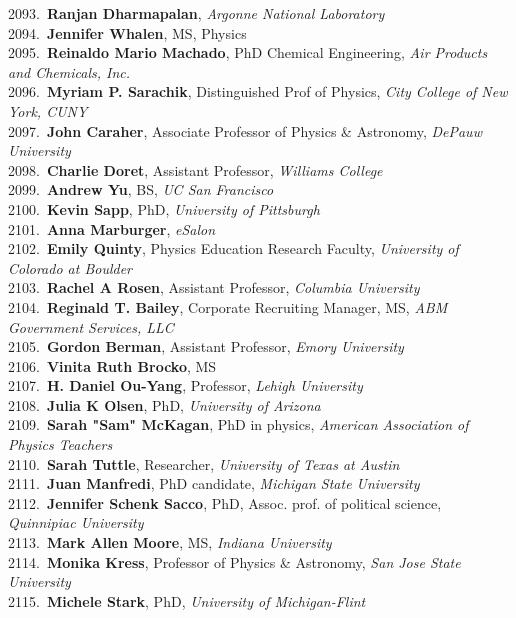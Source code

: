 2093.~{\bf Ranjan Dharmapalan}, {\sl Argonne National Laboratory} \\
2094.~{\bf Jennifer Whalen}, MS, Physics \\
2095.~{\bf Reinaldo Mario Machado}, PhD Chemical Engineering, {\sl Air Products and Chemicals, Inc.} \\
2096.~{\bf Myriam P. Sarachik}, Distinguished Prof of Physics, {\sl City College of New York, CUNY} \\
2097.~{\bf John Caraher}, Associate Professor of Physics \& Astronomy, {\sl DePauw University} \\
2098.~{\bf Charlie Doret}, Assistant Professor, {\sl Williams College} \\
2099.~{\bf Andrew Yu}, BS, {\sl UC San Francisco} \\
2100.~{\bf Kevin Sapp}, PhD, {\sl University of Pittsburgh} \\
2101.~{\bf Anna Marburger}, {\sl eSalon} \\
2102.~{\bf Emily Quinty}, Physics Education Research Faculty, {\sl University of Colorado at Boulder} \\
2103.~{\bf Rachel A Rosen}, Assistant Professor, {\sl Columbia University} \\
2104.~{\bf Reginald T. Bailey}, Corporate Recruiting Manager, MS, {\sl ABM Government Services, LLC } \\
2105.~{\bf Gordon Berman}, Assistant Professor, {\sl Emory University} \\
2106.~{\bf Vinita Ruth Brocko}, MS \\
2107.~{\bf H. Daniel Ou-Yang}, Professor, {\sl Lehigh University} \\
2108.~{\bf Julia K Olsen}, PhD, {\sl University of Arizona} \\
2109.~{\bf Sarah "Sam" McKagan}, PhD in physics, {\sl American Association of Physics Teachers} \\
2110.~{\bf Sarah Tuttle}, Researcher, {\sl University of Texas at Austin} \\
2111.~{\bf Juan Manfredi}, PhD candidate, {\sl Michigan State University} \\
2112.~{\bf Jennifer Schenk Sacco}, PhD, Assoc. prof. of political science, {\sl Quinnipiac University} \\
2113.~{\bf Mark Allen Moore}, MS, {\sl Indiana University} \\
2114.~{\bf Monika Kress}, Professor of Physics \& Astronomy, {\sl San Jose State University} \\
2115.~{\bf Michele Stark}, PhD, {\sl University of Michigan-Flint} \\
